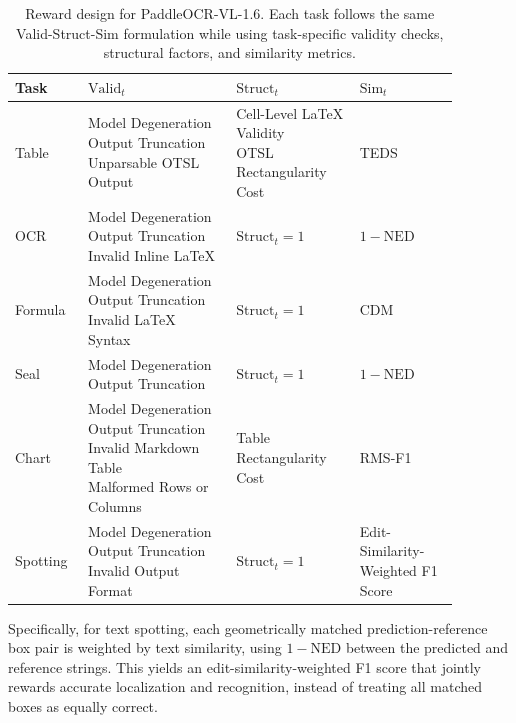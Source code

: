 \documentclass[11pt, a4paper,logo,  copyright, nonumbering]{paddleocr}
\begin{document}
\begin{table}[t]
\centering
\small
\setcellgapes{2pt}
\makegapedcells
\renewcommand{\arraystretch}{1.15}
\begin{tabular}{p{0.13\linewidth} p{0.30\linewidth} p{0.25\linewidth} p{0.20\linewidth}}
\toprule
Task & $\mathrm{Valid}_t$ & $\mathrm{Struct}_t$ & $\mathrm{Sim}_t$ \\
\midrule
Table &
\makecell[l]{Model Degeneration \\[1pt] Output Truncation \\[1pt] Unparsable OTSL Output} &
\makecell[l]{Cell-Level LaTeX Validity \\[1pt] OTSL Rectangularity Cost} &
TEDS \\[0.6em]
OCR &
\makecell[l]{Model Degeneration \\[1pt] Output Truncation \\[1pt] Invalid Inline LaTeX} &
$\mathrm{Struct}_t = 1$ &
$1-\mathrm{NED}$ \\[0.6em]
Formula &
\makecell[l]{Model Degeneration \\[1pt] Output Truncation \\[1pt] Invalid LaTeX Syntax} &
$\mathrm{Struct}_t = 1$ &
CDM \\[0.6em]
Seal &
\makecell[l]{Model Degeneration \\[1pt] Output Truncation} &
$\mathrm{Struct}_t = 1$ &
$1-\mathrm{NED}$ \\[0.6em]
Chart &
\makecell[l]{Model Degeneration \\[1pt] Output Truncation \\[1pt] Invalid Markdown Table \\[1pt] Malformed Rows or Columns} &
Table Rectangularity Cost &
RMS-F1 \\[0.6em]
Spotting &
\makecell[l]{Model Degeneration \\[1pt] Output Truncation \\[1pt] Invalid Output Format} &
$\mathrm{Struct}_t = 1$ &
Edit-Similarity-Weighted F1 Score \\
\bottomrule
\end{tabular}
\caption{Reward design for PaddleOCR-VL-1.6. Each task follows the same Valid-Struct-Sim formulation while using task-specific validity checks, structural factors, and similarity metrics.}
\label{tab:representation_aware_reward}
\end{table}

Specifically, for text spotting, each geometrically matched prediction-reference box pair is weighted by text similarity, using $1-\mathrm{NED}$ between the predicted and reference strings. This yields an edit-similarity-weighted F1 score that jointly rewards accurate localization and recognition, instead of treating all matched boxes as equally correct.
\end{document}
